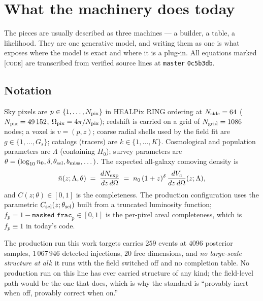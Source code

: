 \documentclass[11pt]{article}
\theoremstyle{definition}
\theoremstyle{remark}
\newcommand{\nbar}{\bar n}
\newcommand{\Npix}{N_{\rm pix}}
\begin{document}
\section{What the machinery does today}
\label{sec:today}

The pieces are usually described as three machines --- a builder, a table, a
likelihood. They are one generative model, and writing them as one is what
exposes where the model is exact and where it is a plug-in. All equations marked
\textsc{[code]} are transcribed from verified source lines at \texttt{master}
\texttt{0c5b3db}.

\subsection{Notation}

Sky pixels are $p\in\{1,\dots,\Npix\}$ in HEALPix RING ordering at
$N_{\rm side}=64$ ($\Npix=49\,152$, $\Omega_{\rm pix}=4\pi/\Npix$); redshift is
carried on a grid of $N_{\rm grid}=1086$ nodes; a voxel is $v=(p,z)$; coarse
radial shells used by the field fit are $g\in\{1,\dots,G_s\}$; catalogs (tracers)
are $k\in\{1,\dots,K\}$. Cosmological and population parameters are $\Lambda$
(containing $H_0$); survey parameters are
$\theta=(\log_{10}n_0,\delta,\theta_{\rm sel},b_{\rm miss},\dots)$. The expected
all-galaxy comoving density is
\begin{equation}
  \nbar(z;\Lambda,\theta)\;=\;\frac{dN_{\rm exp}}{dz\,d\Omega}
  \;=\;n_0\,(1+z)^{\delta}\,\frac{dV_c}{dz\,d\Omega}(z;\Lambda),
  \label{eq:dNexp}
\end{equation}
and $C(z;\theta)\in[0,1]$ is the completeness. The production configuration uses
the parametric $C_{\rm sel}(z;\theta_{\rm sel})$ built from a truncated luminosity
function; $f_p=1-\texttt{masked\_frac}_p\in[0,1]$ is the per-pixel areal
completeness, which is $f_p\equiv1$ in today's code.

The production run this work targets carries $259$ events at $4096$ posterior
samples, $1\,067\,946$ detected injections, $20$ free dimensions, and
\emph{no large-scale structure at all}: it runs with the field switched off and no
completion table. No production run on this line has ever carried structure of any
kind; the field-level path would be the one that does, which is why the standard is
``provably inert when off, provably correct when on.''
\end{document}
